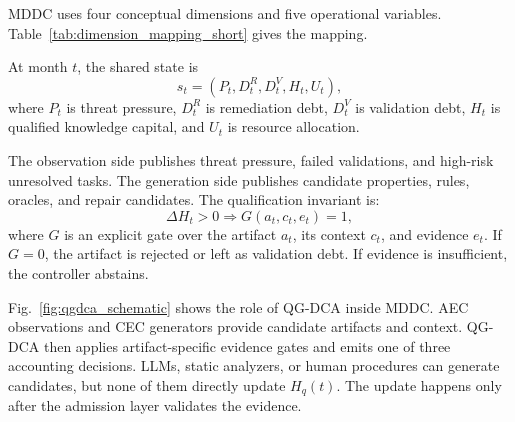 ﻿\documentclass[lettersize,journal]{IEEEtran}
\begin{document}
MDDC uses four conceptual dimensions and five operational variables. Table~\ref{tab:dimension_mapping_short} gives the mapping.

\begin{table}[!t]
\caption{MDDC conceptual dimensions and operational variables}
\label{tab:dimension_mapping_short}
\centering
\scriptsize
\renewcommand{\arraystretch}{1.15}
\end{table}

At month $t$, the shared state is
\begin{equation}
s_t = (P_t, D^R_t, D^V_t, H_t, U_t),
\end{equation}
where $P_t$ is threat pressure, $D^R_t$ is remediation debt, $D^V_t$ is validation debt, $H_t$ is qualified knowledge capital, and $U_t$ is resource allocation.

The observation side publishes threat pressure, failed validations, and high-risk unresolved tasks. The generation side publishes candidate properties, rules, oracles, and repair candidates. The qualification invariant is:
\begin{equation}
\Delta H_t > 0 \Rightarrow G(a_t, c_t, e_t)=1,
\end{equation}
where $G$ is an explicit gate over the artifact $a_t$, its context $c_t$, and evidence $e_t$. If $G=0$, the artifact is rejected or left as validation debt. If evidence is insufficient, the controller abstains.

Fig.~\ref{fig:qgdca_schematic} shows the role of QG-DCA inside MDDC. AEC observations and CEC generators provide candidate artifacts and context. QG-DCA then applies artifact-specific evidence gates and emits one of three accounting decisions. LLMs, static analyzers, or human procedures can generate candidates, but none of them directly update $H_q(t)$. The update happens only after the admission layer validates the evidence.
\end{document}
